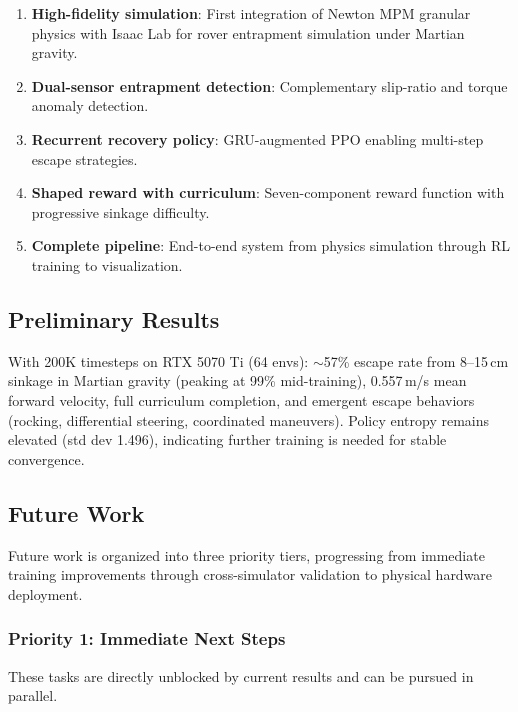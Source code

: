 \documentclass[12pt,a4paper]{article}
\begin{document}
\begin{enumerate}
    \item \textbf{High-fidelity simulation}: First integration of Newton MPM granular physics with Isaac Lab for rover entrapment simulation under Martian gravity.
    \item \textbf{Dual-sensor entrapment detection}: Complementary slip-ratio and torque anomaly detection.
    \item \textbf{Recurrent recovery policy}: GRU-augmented PPO enabling multi-step escape strategies.
    \item \textbf{Shaped reward with curriculum}: Seven-component reward function with progressive sinkage difficulty.
    \item \textbf{Complete pipeline}: End-to-end system from physics simulation through RL training to visualization.
\end{enumerate}

\subsection{Preliminary Results}

With 200K timesteps on RTX 5070 Ti (64 envs): $\sim$57\% escape rate from 8--15\,cm sinkage in Martian gravity (peaking at 99\% mid-training), 0.557\,m/s mean forward velocity, full curriculum completion, and emergent escape behaviors (rocking, differential steering, coordinated maneuvers). Policy entropy remains elevated (std dev 1.496), indicating further training is needed for stable convergence.
\subsection{Future Work}

Future work is organized into three priority tiers, progressing from immediate training improvements through cross-simulator validation to physical hardware deployment.

\subsubsection{Priority 1: Immediate Next Steps}

These tasks are directly unblocked by current results and can be pursued in parallel.
\end{document}
